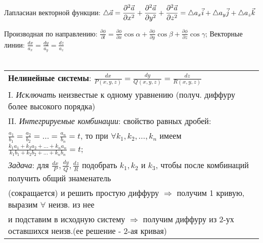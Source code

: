 Лапласиан векторной функции:
$\displaystyle \mathop{}\!\mathbin\bigtriangleup\vec{a} = \frac{\partial^2\vec{a}}{\partial{x^2}} + \frac{\partial^2\vec{a}}{\partial{y^2}} + \frac{\partial^2\vec{a}}{\partial{z^2}} = 
\mathop{}\!\mathbin\bigtriangleup{a_x}\vec{i} + \mathop{}\!\mathbin\bigtriangleup{a_y}\vec{j} + \mathop{}\!\mathbin\bigtriangleup{a_z}\vec{k}$

\vspace{1ex}
Производная по направлению: $\displaystyle\frac{\partial\phi}{\partial{l}} = \frac{\partial\phi}{\partial{x}}\cos{\alpha} + \frac{\partial\phi}{\partial{y}}\cos{\beta} + \frac{\partial\phi}{\partial{z}}\cos{\gamma}$;
Векторные линии: 
$\displaystyle \frac{dx}{a_x} = \frac{dy}{a_y} = \frac{dz}{a_z}$
\\\\
\begin{tabular}{|l|}
	\hline
	\textbf{Нелинейные системы}: $\displaystyle\frac{dx}{P(x,y,z)} = \frac{dy}{Q(x,y,z)} = \frac{dz}{R(x,y,z)}$ \\
	I. \textit{Исключать} неизвестые к одному уравнению (получ. диффуру более высокого порядка) \\
	II. \textit{Интегрируемые комбинации}: свойство равных дробей: \\ 
	$\displaystyle \frac{a_1}{b_1} = \frac{a_2}{b_2} = ... = \frac{a_n}{b_n} = t$, то при $\forall k_1, k_2,...,k_n$ имеем
	$\displaystyle \frac{k_1a_1 + k_2a_2+...+k_na_n}{k_1b_1 + k_2b_2 +...+k_nb_n} = t$; \\ 
	\textit{Задача}: для $\displaystyle \frac{dx}{P},\frac{dy}{Q},\frac{dz}{R}$ подобрать $k_1,k_2$ и $k_3$, чтобы после комбинаций получить общий знаменатель \\
	(сокращается) и решить простую диффуру $\Rightarrow$ получим 1 кривую, выразим $\forall$ неизв. из нее \\ 
	и подставим в исходную систему $\Rightarrow$ получим диффуру из 2-ух оставшихся неизв.(ее решение - 2-ая кривая) \\
	\hline
\end{tabular}

